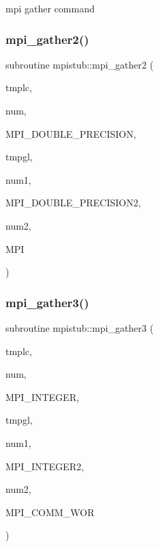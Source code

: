 mpi gather command 

\mbox{\label{namespacempistub_a9be56b07b004daadf8c9baeb3f79a9eb}} 
\subsubsection{\texorpdfstring{mpi\_gather2()}{mpi\_gather2()}}
{\footnotesize\ttfamily subroutine mpistub\+::mpi\+\_\+gather2 (\begin{DoxyParamCaption}\item[{double precision}]{tmplc,  }\item[{}]{num,  }\item[{}]{M\+P\+I\+\_\+\+D\+O\+U\+B\+L\+E\+\_\+\+P\+R\+E\+C\+I\+S\+I\+ON,  }\item[{double precision, dimension(\+:)}]{tmpgl,  }\item[{}]{num1,  }\item[{}]{M\+P\+I\+\_\+\+D\+O\+U\+B\+L\+E\+\_\+\+P\+R\+E\+C\+I\+S\+I\+O\+N2,  }\item[{}]{num2,  }\item[{}]{M\+PI }\end{DoxyParamCaption})}

\mbox{\label{namespacempistub_a4a5262ac6eca022843c0cd39b508e35f}} 
\subsubsection{\texorpdfstring{mpi\_gather3()}{mpi\_gather3()}}
{\footnotesize\ttfamily subroutine mpistub\+::mpi\+\_\+gather3 (\begin{DoxyParamCaption}\item[{integer, dimension(\+:)}]{tmplc,  }\item[{}]{num,  }\item[{}]{M\+P\+I\+\_\+\+I\+N\+T\+E\+G\+ER,  }\item[{integer, dimension(\+:)}]{tmpgl,  }\item[{}]{num1,  }\item[{}]{M\+P\+I\+\_\+\+I\+N\+T\+E\+G\+E\+R2,  }\item[{}]{num2,  }\item[{}]{M\+P\+I\+\_\+\+C\+O\+M\+M\+\_\+\+W\+OR }\end{DoxyParamCaption})}

